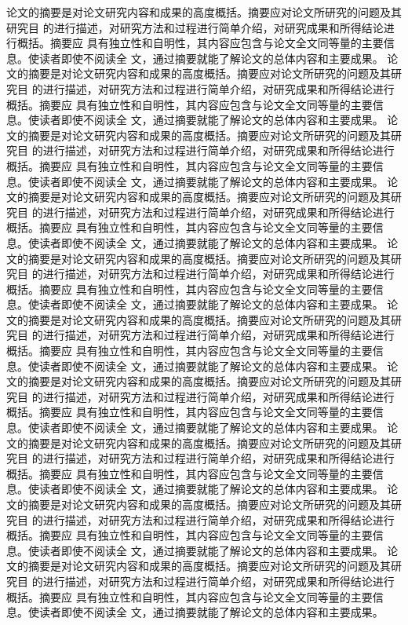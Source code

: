 \begin{cabstract}
论文的摘要是对论文研究内容和成果的高度概括。摘要应对论文所研究的问题及其研究目
  的进行描述，对研究方法和过程进行简单介绍，对研究成果和所得结论进行概括。摘要应
  具有独立性和自明性，其内容应包含与论文全文同等量的主要信息。使读者即使不阅读全
  文，通过摘要就能了解论文的总体内容和主要成果。
  论文的摘要是对论文研究内容和成果的高度概括。摘要应对论文所研究的问题及其研究目
  的进行描述，对研究方法和过程进行简单介绍，对研究成果和所得结论进行概括。摘要应
  具有独立性和自明性，其内容应包含与论文全文同等量的主要信息。使读者即使不阅读全
  文，通过摘要就能了解论文的总体内容和主要成果。
  论文的摘要是对论文研究内容和成果的高度概括。摘要应对论文所研究的问题及其研究目
  的进行描述，对研究方法和过程进行简单介绍，对研究成果和所得结论进行概括。摘要应
  具有独立性和自明性，其内容应包含与论文全文同等量的主要信息。使读者即使不阅读全
  文，通过摘要就能了解论文的总体内容和主要成果。
  论文的摘要是对论文研究内容和成果的高度概括。摘要应对论文所研究的问题及其研究目
  的进行描述，对研究方法和过程进行简单介绍，对研究成果和所得结论进行概括。摘要应
  具有独立性和自明性，其内容应包含与论文全文同等量的主要信息。使读者即使不阅读全
  文，通过摘要就能了解论文的总体内容和主要成果。
  论文的摘要是对论文研究内容和成果的高度概括。摘要应对论文所研究的问题及其研究目
  的进行描述，对研究方法和过程进行简单介绍，对研究成果和所得结论进行概括。摘要应
  具有独立性和自明性，其内容应包含与论文全文同等量的主要信息。使读者即使不阅读全
  文，通过摘要就能了解论文的总体内容和主要成果。
  论文的摘要是对论文研究内容和成果的高度概括。摘要应对论文所研究的问题及其研究目
  的进行描述，对研究方法和过程进行简单介绍，对研究成果和所得结论进行概括。摘要应
  具有独立性和自明性，其内容应包含与论文全文同等量的主要信息。使读者即使不阅读全
  文，通过摘要就能了解论文的总体内容和主要成果。
  论文的摘要是对论文研究内容和成果的高度概括。摘要应对论文所研究的问题及其研究目
  的进行描述，对研究方法和过程进行简单介绍，对研究成果和所得结论进行概括。摘要应
  具有独立性和自明性，其内容应包含与论文全文同等量的主要信息。使读者即使不阅读全
  文，通过摘要就能了解论文的总体内容和主要成果。
  论文的摘要是对论文研究内容和成果的高度概括。摘要应对论文所研究的问题及其研究目
  的进行描述，对研究方法和过程进行简单介绍，对研究成果和所得结论进行概括。摘要应
  具有独立性和自明性，其内容应包含与论文全文同等量的主要信息。使读者即使不阅读全
  文，通过摘要就能了解论文的总体内容和主要成果。
  论文的摘要是对论文研究内容和成果的高度概括。摘要应对论文所研究的问题及其研究目
  的进行描述，对研究方法和过程进行简单介绍，对研究成果和所得结论进行概括。摘要应
  具有独立性和自明性，其内容应包含与论文全文同等量的主要信息。使读者即使不阅读全
  文，通过摘要就能了解论文的总体内容和主要成果。
  论文的摘要是对论文研究内容和成果的高度概括。摘要应对论文所研究的问题及其研究目
  的进行描述，对研究方法和过程进行简单介绍，对研究成果和所得结论进行概括。摘要应
  具有独立性和自明性，其内容应包含与论文全文同等量的主要信息。使读者即使不阅读全
  文，通过摘要就能了解论文的总体内容和主要成果。





\end{cabstract}
